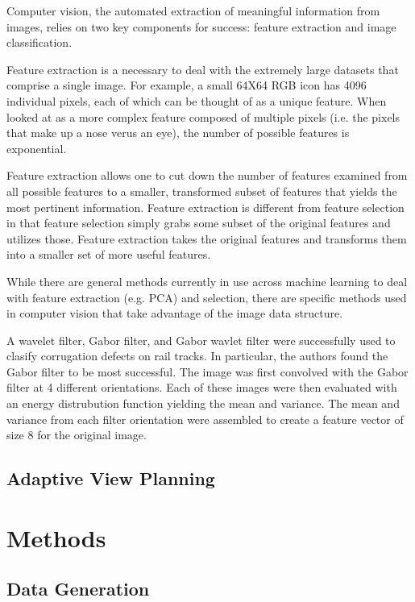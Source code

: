 \documentclass[letterpaper, 10 pt, conference]{ieeeconf}  %
\begin{document}
Computer vision, the automated extraction of meaningful information from images, relies on two key components for success: feature extraction and image classification. 

Feature extraction is a necessary to deal with the extremely large datasets that comprise a single image.  For example, a small 64X64 RGB icon has 4096 individual pixels, each of which can be thought of as a unique feature. When looked at as a more complex feature composed of multiple pixels (i.e. the pixels that make up a nose verus an eye), the number of possible features is exponential. 

Feature extraction allows one to cut down the number of features examined from all possible features to a smaller, transformed subset of features that yields the most pertinent information. Feature extraction is different from feature selection in that feature selection simply grabs some subset of the original features and utilizes those.  Feature extraction takes the original features and transforms them into a smaller set of more useful features.

While there are general methods currently in use across machine learning to deal with feature extraction (e.g. PCA) and selection, there are specific methods used in computer vision that take advantage of the image data structure.

A wavelet filter, Gabor filter, and Gabor wavlet filter were successfully used to clasify corrugation defects on rail tracks\cite{railDefect}. In particular, the authors found the Gabor filter to be most successful. The image was first convolved with the Gabor filter at 4 different orientations. Each of these images were then evaluated with an energy distrubution function yielding the mean and variance.  The mean and variance from each filter orientation were assembled to create a feature vector of size 8 for the original image.

\subsection{Adaptive View Planning}



\section{Methods}

\subsection{Data Generation}
\end{document}
